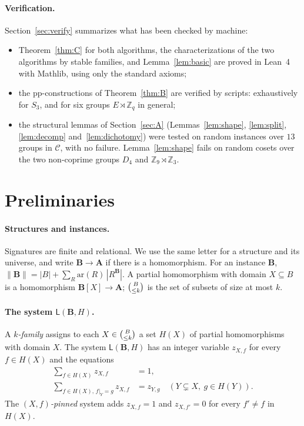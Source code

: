 \documentclass[11pt]{article}
\theoremstyle{definition}
\theoremstyle{remark}
\newcommand{\sub}[2]{\tbinom{#1}{\le #2}}
\newcommand{\size}[1]{\lVert #1\rVert}
\newcommand{\Z}{\mathbb Z}
\begin{document}
\paragraph{Verification.} Section~\ref{sec:verify} summarizes what has been
checked by machine:
\begin{itemize}
\item Theorem~\ref{thm:C} for both algorithms, the characterizations of the two
algorithms by stable families, and Lemma~\ref{lem:basic} are proved in Lean~4
with Mathlib, using only the standard axioms;
\item the pp-constructions of Theorem~\ref{thm:B} are verified by scripts:
exhaustively for $S_3$, and for six groups $E\rtimes\Z_q$ in general;
\item the structural lemmas of Section~\ref{sec:A}
(Lemmas~\ref{lem:shape}, \ref{lem:split}, \ref{lem:decomp}
and~\ref{lem:dichotomy}) were tested on random instances over $13$ groups in
$\mathcal C$, with no failure. Lemma~\ref{lem:shape} fails on random cosets over
the two non-coprime groups $D_4$ and $\Z_9\rtimes\Z_3$.
\end{itemize}

\section{Preliminaries}\label{sec:prelim}

\paragraph{Structures and instances.} Signatures are finite and relational.
We use the same letter for a structure and its universe, and write $\mathbf
B\to\mathbf A$ if there is a homomorphism. For an instance $\mathbf B$,
$\size{\mathbf B}=|B|+\sum_R \mathrm{ar}(R)\,|R^{\mathbf B}|$. A partial
homomorphism with domain $X\subseteq B$ is a homomorphism $\mathbf B[X]\to\mathbf
A$; $\sub Bk$ is the set of subsets of size at most $k$.

\paragraph{The system $\mathsf L(\mathbf B,H)$.} A \emph{$k$-family} assigns to
each $X\in\sub Bk$ a set $H(X)$ of partial homomorphisms with domain $X$. The
system $\mathsf L(\mathbf B,H)$ has an integer variable $z_{X,f}$ for every
$f\in H(X)$ and the equations
\begin{align}
\textstyle\sum_{f\in H(X)} z_{X,f}&=1, \tag{N}\\
\textstyle\sum_{f\in H(X),\,f|_Y=g} z_{X,f}&=z_{Y,g}\quad(Y\subsetneq X,\ g\in H(Y)).\tag{C}
\end{align}
The \emph{$(X,f)$-pinned} system adds $z_{X,f}=1$ and $z_{X,f'}=0$ for every
$f'\ne f$ in $H(X)$.
\end{document}
